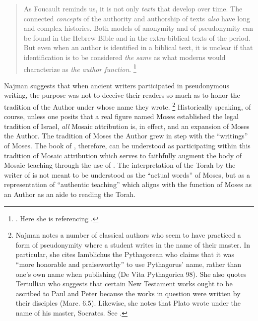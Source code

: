 \begin{quote}
    As Foucault reminds us, it is not only \emph{texts} that develop over time. The connected \emph{concepts} of the authority and authorship of texts \emph{also} have long and complex histories. Both models of anonymity and of pseudonymity can be found in the Hebrew Bible and in the extra-biblical texts of the \secondtemple period. But even when an author is identified in a biblical text, it is unclear if that identification is to be considered \emph{the same} as what moderns would characterize as \emph{the author function}.%
        \footnote{%
            \cite[9--10]{najman2003}. Here she is referencing
            \cite[213]{foucault_essential-foucault_2}.}
\end{quote}
\noindent
Najman suggests that when ancient writers participated in pseudonymous writing, the purpose was not to deceive their readers so much as to honor the tradition of the Author under whose name they wrote.%
    \footnote{Najman notes a number of classical authors who seem to have practiced a form of pseudonymity where a student writes in the name of their master. In particular, she cites Iamblichus the Pythagorean who claims that it was ``more honorable and praiseworthy'' to use Pythagorus' name, rather than one's own name when publishing (De Vita Pythagorica 98). She also quotes Tertullian who suggests that certain New Testament works ought to be ascribed to Paul and Peter because the works in question were written by their disciples (Marc. 6.5). Likewise, she notes that Plato wrote under the name of his master, Socrates. See \cite[13]{najman2003}.}
Historically speaking, of course, unless one posits that a real figure named Moses established the legal tradition of Israel, \emph{all} Mosaic attribution is, in effect, \psgraphical and an expansion of Moses the Author. The tradition of Moses the Author grew in step with the ``writings'' of Moses. The book of \jub, therefore, can be understood as participating within this tradition of Mosaic attribution which serves to faithfully augment the body of Mosaic teaching through the use of \psy. The interpretation of the Torah by the writer of \jub is not meant to be understood as the ``actual words'' of Moses, but as a representation of ``authentic teaching'' which aligns with the function of Moses as an Author as an aide to reading the Torah.\autocite[13]{najman2003}


